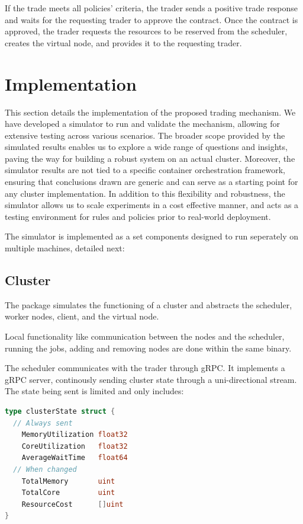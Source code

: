 If the trade meets all policies' criteria, the trader sends a positive trade
response and waits for the requesting trader to approve the contract. Once the
contract is approved, the trader requests the resources to be reserved from the
scheduler, creates the virtual node, and provides it to the requesting trader. 

\section{Implementation} 
This section details the implementation of the proposed trading mechanism. We
have developed a simulator to run and validate the mechanism, allowing for
extensive testing across various scenarios. The broader scope provided by the
simulated results enables us to explore a wide range of questions and insights,
paving the way for building a robust system on an actual cluster. Moreover, the
simulator results are not tied to a specific container orchestration framework,
ensuring that conclusions drawn are generic and can serve as a starting point
for any cluster implementation. In addition to this flexibility and robustness,
the simulator allows us to scale experiments in a cost effective manner, and
acts as a testing environment for rules and policies prior to real-world
deployment.

The simulator is implemented as a set components designed to run
seperately on multiple machines, detailed next:

\subsection{Cluster}

The package simulates the functioning of a cluster and abstracts the scheduler,
worker nodes, client, and the virtual node. 

Local functionality like communication between the nodes and the scheduler,
running the jobs, adding and removing nodes are done within the same binary.

The scheduler communicates with the trader through gRPC. It implements a
gRPC server, continously sending cluster state through a uni-directional stream.
The state being sent is limited and only includes:

\begin{lstlisting}[language=go]
type clusterState struct {
  // Always sent 
	MemoryUtilization float32
	CoreUtilization   float32
	AverageWaitTime   float64
  // When changed
    TotalMemory       uint
	TotalCore         uint
    ResourceCost      []uint
}
\end{lstlisting}

